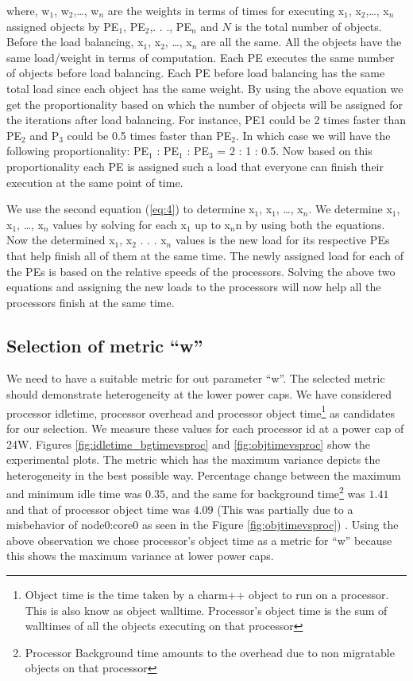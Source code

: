   where, w$_1$, w$_2$,\dots , w$_n$ are the weights in terms of times for executing
  x$_1$, x$_2$,\dots , x$_n$ assigned objects by PE$_1$, PE$_2$,. . ., PE$_n$ 
  and $N$ is the total number of objects. 
  Before the load balancing, x$_1$, x$_2$, \dots,  x$_n$ are all the same. All the objects have
  the same load/weight in terms of computation.  Each PE executes the same
  number of objects before load balancing. Each PE before load balancing has
  the same total load since each object has the same weight. By using the above
  equation we get the proportionality based on which the number of objects will
  be assigned for the iterations after load balancing. For instance, PE1 could
  be 2 times faster than PE$_2$ and P$_3$ could be 0.5 times faster than PE$_2$. In
  which case we will have the following proportionality: PE$_1$ : PE$_1$ : PE$_3$ = 2 :
  1 : 0.5. Now based on this proportionality each PE is assigned such a load
  that everyone can finish their execution at the same point of time.  
  
  We use the second equation (\ref{eq:4}) to determine x$_1$, x$_1$, \dots,
  x$_n$. We determine x$_1$, x$_1$,
  \dots, x$_n$ values by solving for each x$_1$ up to x$_n$n by using both the
  equations. Now the determined x$_1$, x$_2$ . . . x$_n$ values is the new load
  for its respective PEs that help finish all of them at the same time. The
  newly assigned load for each of the PEs is based on the relative speeds of
  the processors. Solving the above two equations and assigning the new loads
  to the processors will now help all the processors finish at the same time.

\subsection{Selection of metric ``w''} 
We need to have a suitable metric for out parameter ``w''.  The selected metric
should demonstrate heterogeneity at the lower power caps. We have considered
processor idletime, processor overhead and processor object
time\footnote{Object time is the time taken by a charm++ object to run on a
  processor. This is also know as object walltime. Processor's object time is
    the sum of walltimes of all the objects executing on that processor} as
    candidates for our selection.  We measure these values for each processor
    id at a power cap of 24W.  Figures \ref{fig:idletime_bgtimevsproc} and
    \ref{fig:objtimevsproc} show the experimental plots.  The metric which has
    the maximum variance depicts the heterogeneity in the best possible way.
    Percentage change between the maximum and minimum idle time was $0.35$, and
    the same for background time\footnote{Processor Background time amounts to
      the overhead due to non migratable objects on that processor} was $1.41$
      and that of processor object time was $4.09$ (This was partially due to a
          misbehavior of node0:core0 as seen in the Figure
          \ref{fig:objtimevsproc}) .  Using the above observation we chose
      processor's object time as a metric for ``w'' because this shows the
      maximum variance at lower power caps. 
   

